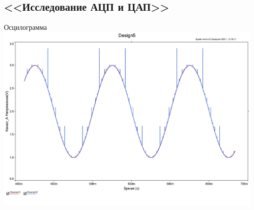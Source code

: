 \documentclass[11pt]{article}
\begin{document}
\subsection{<<Исследование АЦП и ЦАП>>}
\begin{center}
    Осцилограмма
    \includegraphics[width=1\linewidth]{5/graph.jpg}
\end{center}
\end{document}
